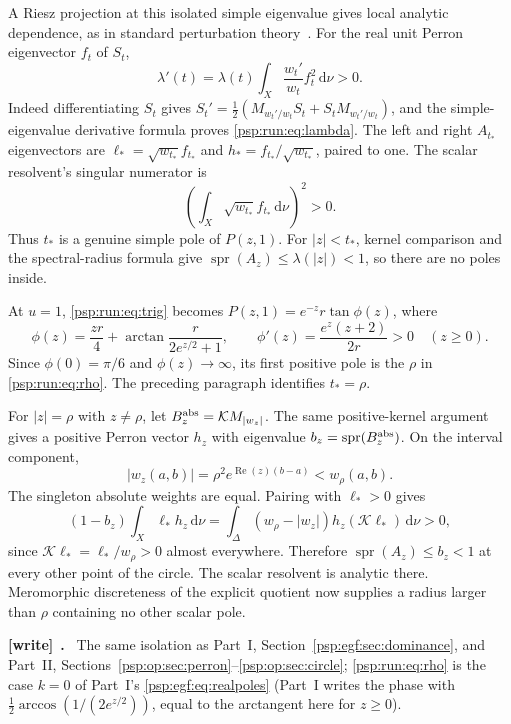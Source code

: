 \documentclass[11pt,letterpaper]{article}
\numberwithin{equation}{section}
\theoremstyle{remark}\newtheorem{remark}[theorem]{Remark}
\newcommand{\dd}{\,\mathrm d}
\newcommand{\spr}{\operatorname{spr}}
\newenvironment{writenote}[1][]{\par\smallskip\begingroup\small
 \noindent\textbf{[write]}\if\relax\detokenize{#1}\relax\else~\textbf{#1.}\fi\ }%
 {\par\endgroup\smallskip}
\begin{document}
A Riesz projection at this isolated simple eigenvalue gives local
analytic dependence, as in standard perturbation theory~\cite{kato}.
For the real unit Perron eigenvector $f_t$ of $S_t$,
\begin{equation}\label{psp:run:eq:lambda}
 \lambda'(t)=\lambda(t)\int_X\frac{w_t'}{w_t}f_t^2\dd\nu>0.
\end{equation}
Indeed differentiating $S_t$ gives
$S_t'=\tfrac12(M_{w_t'/w_t}S_t+S_tM_{w_t'/w_t})$, and the simple-eigenvalue
derivative formula proves \eqref{psp:run:eq:lambda}. The left and right
$A_{t_*}$ eigenvectors are $\ell_*=\sqrt{w_{t_*}}f_{t_*}$ and
$h_*=f_{t_*}/\sqrt{w_{t_*}}$, paired to one. The scalar resolvent's
singular numerator is
\[
 \left(\int_X\sqrt{w_{t_*}}f_{t_*}\dd\nu\right)^2>0.
\]
Thus $t_*$ is a genuine simple pole of $P(z,1)$.
For $|z|<t_*$, kernel comparison and the spectral-radius formula give
$\spr(A_z)\leq\lambda(|z|)<1$, so there are no poles inside.

At $u=1$, \eqref{psp:run:eq:trig} becomes $P(z,1)=e^{-z}r\tan\phi(z)$, where
\[
 \phi(z)=\frac{zr}4+\arctan\frac r{2e^{z/2}+1},\qquad
 \phi'(z)=\frac{e^z(z+2)}{2r}>0\quad(z\geq0).
\]
Since $\phi(0)=\pi/6$ and $\phi(z)\to\infty$, its first positive pole is
the $\rho$ in \eqref{psp:run:eq:rho}. The preceding paragraph identifies $t_*=\rho$.

For $|z|=\rho$ with $z\ne\rho$, let
$B_z^{\rm abs}=\mathcal K M_{|w_z|}$. The same positive-kernel argument
gives a positive Perron vector $h_z$ with eigenvalue
$b_z=\spr(B_z^{\rm abs})$. On the interval component,
\[
 |w_z(a,b)|=\rho^2e^{\operatorname{Re}(z)(b-a)}<w_\rho(a,b).
\]
The singleton absolute weights are equal. Pairing with $\ell_*>0$ gives
\[
 (1-b_z)\int_X\ell_*h_z\dd\nu
 =\int_\Delta(w_\rho-|w_z|)h_z(\mathcal K\ell_*)\dd\nu>0,
\]
since $\mathcal K\ell_*=\ell_*/w_\rho>0$ almost everywhere. Therefore
$\spr(A_z)\leq b_z<1$ at every other point of the circle. The scalar
resolvent is analytic there. Meromorphic discreteness of the explicit
quotient now supplies a radius larger than $\rho$ containing no other
scalar pole.
\begin{writenote}
The same isolation as Part~I, Section~\ref{psp:egf:sec:dominance}, and Part~II, Sections~\ref{psp:op:sec:perron}--\ref{psp:op:sec:circle}; \eqref{psp:run:eq:rho} is the case $k=0$ of Part~I's \eqref{psp:egf:eq:realpoles} (Part~I writes the phase with $\frac12\arccos(1/(2e^{z/2}))$, equal to the arctangent here for $z\ge0$).
\end{writenote}
\end{document}

